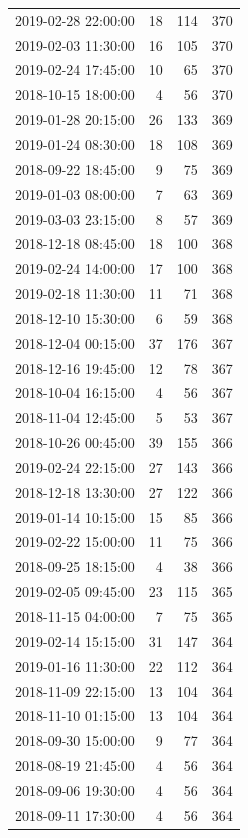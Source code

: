 \begin{tabular}{lrrr}
2019-02-28 22:00:00 & 18 & 114 & 370 \\
2019-02-03 11:30:00 & 16 & 105 & 370 \\
2019-02-24 17:45:00 & 10 & 65 & 370 \\
2018-10-15 18:00:00 & 4 & 56 & 370 \\
2019-01-28 20:15:00 & 26 & 133 & 369 \\
2019-01-24 08:30:00 & 18 & 108 & 369 \\
2018-09-22 18:45:00 & 9 & 75 & 369 \\
2019-01-03 08:00:00 & 7 & 63 & 369 \\
2019-03-03 23:15:00 & 8 & 57 & 369 \\
2018-12-18 08:45:00 & 18 & 100 & 368 \\
2019-02-24 14:00:00 & 17 & 100 & 368 \\
2019-02-18 11:30:00 & 11 & 71 & 368 \\
2018-12-10 15:30:00 & 6 & 59 & 368 \\
2018-12-04 00:15:00 & 37 & 176 & 367 \\
2018-12-16 19:45:00 & 12 & 78 & 367 \\
2018-10-04 16:15:00 & 4 & 56 & 367 \\
2018-11-04 12:45:00 & 5 & 53 & 367 \\
2018-10-26 00:45:00 & 39 & 155 & 366 \\
2019-02-24 22:15:00 & 27 & 143 & 366 \\
2018-12-18 13:30:00 & 27 & 122 & 366 \\
2019-01-14 10:15:00 & 15 & 85 & 366 \\
2019-02-22 15:00:00 & 11 & 75 & 366 \\
2018-09-25 18:15:00 & 4 & 38 & 366 \\
2019-02-05 09:45:00 & 23 & 115 & 365 \\
2018-11-15 04:00:00 & 7 & 75 & 365 \\
2019-02-14 15:15:00 & 31 & 147 & 364 \\
2019-01-16 11:30:00 & 22 & 112 & 364 \\
2018-11-09 22:15:00 & 13 & 104 & 364 \\
2018-11-10 01:15:00 & 13 & 104 & 364 \\
2018-09-30 15:00:00 & 9 & 77 & 364 \\
2018-08-19 21:45:00 & 4 & 56 & 364 \\
2018-09-06 19:30:00 & 4 & 56 & 364 \\
2018-09-11 17:30:00 & 4 & 56 & 364 \\

\end{tabular}

